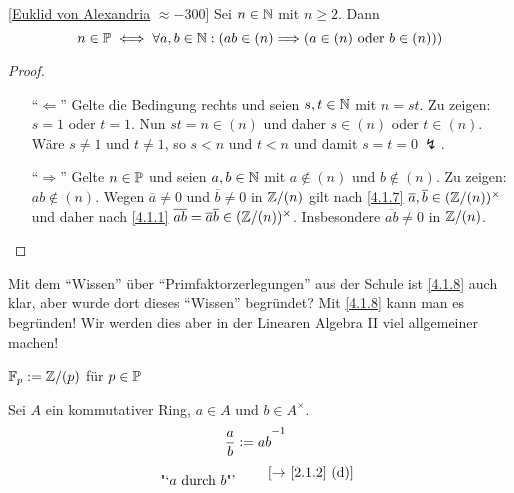 \documentclass[../../main.tex]{subfiles}
\begin{document}
\begin{kor}\label{4.1.8}{\rm[\href{http://de.wikipedia.org/wiki/Euklid}{Euklid von Alexandria} $\approx -300$]}
Sei $n\in \N$ mit $n\geq 2$. Dann
$$n\in\P\iff \forall a,b\in\N:(ab\in(n)\Longrightarrow(a\in(n)\text{ oder }b\in(n)))$$
\end{kor}
\begin{proof}
\begin{itemize}
\item["`$\Longleftarrow$"'] Gelte die Bedingung rechts und seien $s,t\in\N$ mit $n=st$. Zu zeigen: $s=1$ oder $t=1$. Nun $st=n\in(n)$ und daher $s\in(n)$ oder $t\in (n)$. Wäre $s\neq 1$ und $t\neq 1$, so $s<n$ und $t<n$ und damit $s=t=0~\lightning$.
\item["`$\Longrightarrow$"'] Gelte $n\in\P$ und seien $a,b\in\N$ mit $a\notin(n)$ und $b\notin (n)$. Zu zeigen: $ab\notin(n)$. Wegen $\overline{a}\neq 0$ und $\overline{b}\neq 0$ in $\Z/(n)$ gilt nach \ref{4.1.7} $\overline{a},\overline{b}\in(\Z/(n))^\times$ und daher nach \ref{4.1.1} $\overline{ab}=\overline{a}\overline{b}\in(\Z/(n))^\times$. Insbesondere $\overline{ab}\neq 0$ in $\Z/(n)$.
\end{itemize}
\end{proof}

\begin{bem}\label{4.1.9}
Mit dem "`Wissen"' über "`Primfaktorzerlegungen"' aus der Schule ist \ref{4.1.8} auch klar, aber wurde dort dieses "`Wissen"' begründet? Mit \ref{4.1.8} kann man es begründen! Wir werden dies aber in der Linearen Algebra II viel allgemeiner machen!
\end{bem}

\begin{nt}\label{4.1.10}
$\F_p:=\Z/(p)$ für $p\in\P$
\end{nt}

\begin{nt}\label{4.1.11}
Sei $A$ ein kommutativer Ring, $a\in A$ und $b\in A^\times$.
\begin{align*}
\frac{a}{b}&:=ab^{\underset{\tikz\node[inner sep=0pt,outer sep=-2pt](p1){};}{-1}}\\
\text{"`$a$ durch $b$"'}&\qquad\tikz\node(p2){[$\to$ \ref{2.1.2} (d)]};
\end{align*}
\end{nt}
\end{document}
